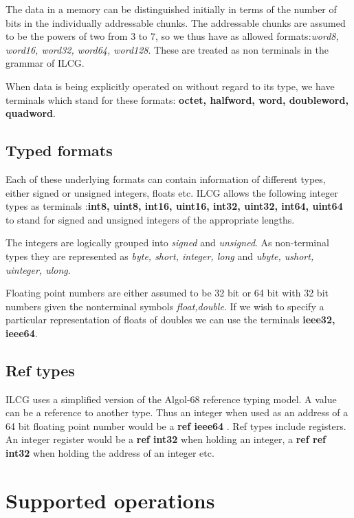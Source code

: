 {{The data in a memory can be distinguished initially in terms of the
number of bits in the individually addressable chunks. The addressable
chunks are assumed to be the powers of two from 3 to 7, so we thus
have as allowed formats:\textsl{word8, word16, word32, word64, word128}.
These are treated as non terminals in the grammar of ILCG.

When data is being explicitly operated on without regard to its type,
we have terminals which stand for these formats: \textbf{octet, halfword,
word, doubleword, quadword}. 


\subsection{Typed formats}

Each of these underlying formats can contain information of different
types, either signed or unsigned integers, floats etc. ILCG allows
the following integer types as terminals :\textbf{int8, uint8, int16,
uint16, int32, uint32, int64, uint64} to stand for signed and unsigned
integers of the appropriate lengths.

The integers are logically grouped into \textsl{signed} and \textsl{unsigned}.
As non-terminal types they are represented as \textsl{byte, short,
integer, long} and \textsl{ubyte, ushort, uinteger, ulong}.

Floating point numbers are either assumed to be 32 bit or 64 bit with
32 bit numbers given the nonterminal symbols \textsl{float,double}.
If we wish to specify a particular representation of floats of doubles
we can use the terminals \textbf{ieee32, ieee64}.


\subsection{Ref types}

ILCG uses a simplified version of the Algol-68 reference typing model.
A value can be a reference to another type. Thus an integer when used
as an address of a 64 bit floating point number would be a \textbf{ref
ieee64} . Ref types include registers. An integer register would be
a \textbf{ref int32} when holding an integer, a \textbf{ref ref int32}
when holding the address of an integer etc. 


\section{Supported operations}


}}

